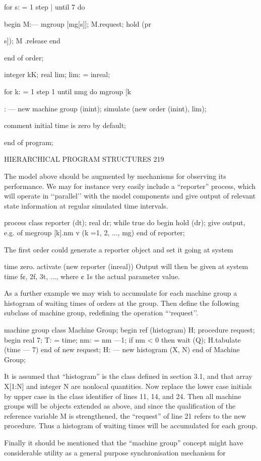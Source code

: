{{{{	for s: = 1 step | until 7 do
	
	begin M:— mgroup [mg[s]]; M.request; hold (pr{s]); M .release end
		
		end of order;
		
		integer kK; real lim; lim: = inreal;
		
		for k: = 1 step 1 until nmg do mgroup [k}: — new machine group (inint); simulate (new order (inint), lim);
	
	comment initial time is zero by default;
	
	end of program;
	
	HIERARCHICAL PROGRAM STRUCTURES 219
	
	The model above should be augmented by mechanisms for observing its performance. We may for instance very easily include a “reporter” process, which will operate in ‘‘parallel’’ with the model components and give output of relevant state information at regular simulated time intervals.
	
	process class reporter (dt); real dr; while true do begin hold (dr); give output, e.g. of megroup [k].nm v (k =1, 2, ..., mg) end of reporter;
	
	The first order could generate a reporter object and set it going at system
	
	time zero. activate (new reporter (inreal)) Output will then be given at system time f¢, 2f, 3t, ..., where ¢ 1s the actual parameter value.
	
	As a further example we may wish to accumulate for each machine group a histogram of waiting times of orders at the group. Then define the following subclass of machine group, redefining the operation “‘request’’.
	
	machine group class Machine Group; begin ref (histogram) H; procedure request; begin real 7; T: = time; nm: = nm —1; if nm < 0 then wait (Q); H.tabulate (time — 7) end of new request; H: — new histogram (X, N) end of Machine Group;
	
	It is assumed that “histogram” is the class defined in section 3.1, and that array X[1:N] and integer N are nonlocal quantities. Now replace the lower case initials by upper case in the class identifier of lines 11, 14, and 24. Then all machine groups will be objects extended as above, and since the qualification of the reference variable M is strengthened, the “request” of line 21 refers to the new procedure. Thus a histogram of waiting times will be accumulated for each group.
	
	Finally it should be mentioned that the “machine group” concept might have considerable utility as a general purpose synchronisation mechanism for
	
}}}}
